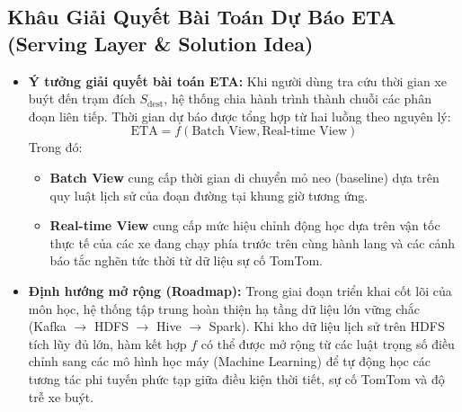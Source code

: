 \documentclass[11pt,a4paper]{article}
\begin{document}
\subsection{Khâu Giải Quyết Bài Toán Dự Báo ETA (Serving Layer \& Solution Idea)}
\begin{itemize}[leftmargin=*,noitemsep,topsep=1.5pt]
    \item \textbf{Ý tưởng giải quyết bài toán ETA:} Khi người dùng tra cứu thời gian xe buýt đến trạm đích $S_{\text{dest}}$, hệ thống chia hành trình thành chuỗi các phân đoạn liên tiếp. Thời gian dự báo được tổng hợp từ hai luồng theo nguyên lý:
    \begin{equation}
        \text{ETA} = f(\text{Batch View}, \text{Real-time View})
    \end{equation}
    Trong đó:
    \begin{itemize}[leftmargin=*,noitemsep]
        \item \textbf{Batch View} cung cấp thời gian di chuyển mỏ neo (baseline) dựa trên quy luật lịch sử của đoạn đường tại khung giờ tương ứng.
        \item \textbf{Real-time View} cung cấp mức hiệu chỉnh động học dựa trên vận tốc thực tế của các xe đang chạy phía trước trên cùng hành lang và các cảnh báo tắc nghẽn tức thời từ dữ liệu sự cố TomTom.
    \end{itemize}
    \item \textbf{Định hướng mở rộng (Roadmap):} Trong giai đoạn triển khai cốt lõi của môn học, hệ thống tập trung hoàn thiện hạ tầng dữ liệu lớn vững chắc (Kafka $\to$ HDFS $\to$ Hive $\to$ Spark). Khi kho dữ liệu lịch sử trên HDFS tích lũy đủ lớn, hàm kết hợp $f$ có thể được mở rộng từ các luật trọng số điều chỉnh sang các mô hình học máy (Machine Learning) để tự động học các tương tác phi tuyến phức tạp giữa điều kiện thời tiết, sự cố TomTom và độ trễ xe buýt.
\end{itemize}
\end{document}
